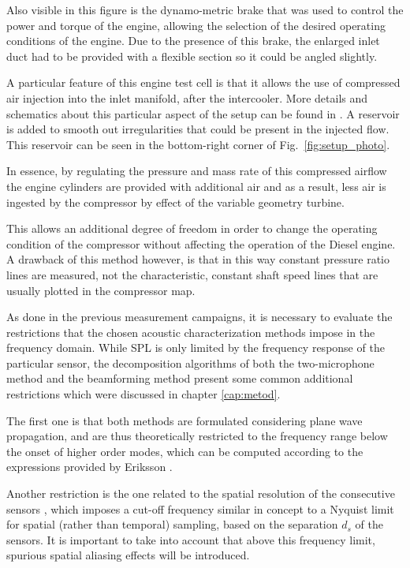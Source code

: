 Also visible in this figure is the dynamo-metric brake that was used to control the power and torque of the engine, allowing the selection of the desired operating conditions of the engine. Due to the presence of this brake, the enlarged inlet duct had to be provided with a flexible section so it could be angled slightly.

A particular feature of this engine test cell is that it allows the use of compressed air injection into the inlet manifold, after the intercooler. More details and schematics about this particular aspect of the setup can be found in \cite{galindo2013engine,galindo2011measurement}. A reservoir is added to smooth out irregularities that could be present in the injected flow. This reservoir can be seen in the bottom-right corner of Fig.~\ref{fig:setup_photo}.

In essence, by regulating the pressure and mass rate of this compressed airflow the engine cylinders are provided with additional air and as a result, less air is ingested by the compressor by effect of the variable geometry turbine.

This allows an additional degree of freedom in order to change the operating condition of the compressor without affecting the operation of the Diesel engine. A drawback of this method however, is that in this way constant pressure ratio lines are measured, not the characteristic, constant shaft speed lines that are usually plotted in the compressor map.

As done in the previous measurement campaigns, it is necessary to evaluate the restrictions that the chosen acoustic characterization methods impose in the frequency domain. While SPL is only limited by the frequency response of the particular sensor, the decomposition algorithms of both the two-microphone method and the beamforming method present some common additional restrictions which were discussed in chapter \ref{cap:metod}.

The first one is that both methods are formulated considering plane wave propagation, and are thus theoretically restricted to the frequency range below the onset of higher order modes, which can be computed according to the expressions provided by Eriksson \cite{eriksson1980higher}.

Another restriction is the one related to the spatial resolution of the consecutive sensors \cite{seybert1988two}, which imposes a cut-off frequency similar in concept to a Nyquist limit for spatial (rather than temporal) sampling, based on the separation $d_s$ of the sensors. It is important to take into account that above this frequency limit, spurious spatial aliasing effects will be introduced.

